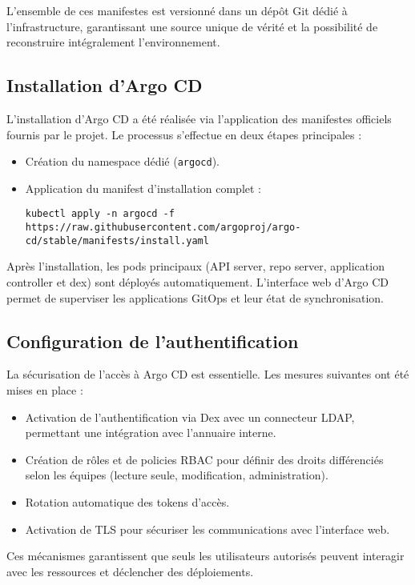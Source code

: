 L’ensemble de ces manifestes est versionné dans un dépôt Git dédié à l’infrastructure, garantissant une source unique de vérité et la possibilité de reconstruire intégralement l’environnement.

\subsection{Installation d’Argo CD}

L’installation d’Argo CD a été réalisée via l’application des manifestes officiels fournis par le projet.
Le processus s’effectue en deux étapes principales :
\begin{itemize}
	\item Création du namespace dédié (\texttt{argocd}).
	\item Application du manifest d’installation complet :
	      \begin{verbatim}
kubectl apply -n argocd -f https://raw.githubusercontent.com/argoproj/argo-cd/stable/manifests/install.yaml
\end{verbatim}
\end{itemize}

Après l’installation, les pods principaux (API server, repo server, application controller et dex) sont déployés automatiquement.
L’interface web d’Argo CD permet de superviser les applications GitOps et leur état de synchronisation.

\subsection{Configuration de l’authentification}

La sécurisation de l’accès à Argo CD est essentielle.
Les mesures suivantes ont été mises en place :
\begin{itemize}
	\item Activation de l’authentification via Dex avec un connecteur LDAP, permettant une intégration avec l’annuaire interne.
	\item Création de rôles et de policies RBAC pour définir des droits différenciés selon les équipes (lecture seule, modification, administration).
	\item Rotation automatique des tokens d’accès.
	\item Activation de TLS pour sécuriser les communications avec l’interface web.
\end{itemize}

Ces mécanismes garantissent que seuls les utilisateurs autorisés peuvent interagir avec les ressources et déclencher des déploiements.

